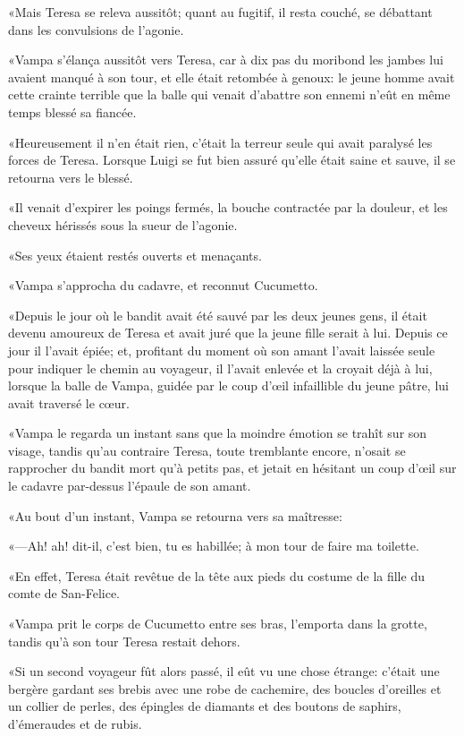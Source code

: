 «Mais Teresa se releva aussitôt; quant au fugitif, il resta couché, se débattant dans les convulsions de l'agonie. 

«Vampa s'élança aussitôt vers Teresa, car à dix pas du moribond les jambes lui avaient manqué à son tour, et elle était retombée à genoux: le jeune homme avait cette crainte terrible que la balle qui venait d'abattre son ennemi n'eût en même temps blessé sa fiancée. 

«Heureusement il n'en était rien, c'était la terreur seule qui avait paralysé les forces de Teresa. Lorsque Luigi se fut bien assuré qu'elle était saine et sauve, il se retourna vers le blessé. 

«Il venait d'expirer les poings fermés, la bouche contractée par la douleur, et les cheveux hérissés sous la sueur de l'agonie. 

«Ses yeux étaient restés ouverts et menaçants. 

«Vampa s'approcha du cadavre, et reconnut Cucumetto.  

«Depuis le jour où le bandit avait été sauvé par les deux jeunes gens, il était devenu amoureux de Teresa et avait juré que la jeune fille serait à lui. Depuis ce jour il l'avait épiée; et, profitant du moment où son amant l'avait laissée seule pour indiquer le chemin au voyageur, il l'avait enlevée et la croyait déjà à lui, lorsque la balle de Vampa, guidée par le coup d'œil infaillible du jeune pâtre, lui avait traversé le cœur. 

«Vampa le regarda un instant sans que la moindre émotion se trahît sur son visage, tandis qu'au contraire Teresa, toute tremblante encore, n'osait se rapprocher du bandit mort qu'à petits pas, et jetait en hésitant un coup d'œil sur le cadavre par-dessus l'épaule de son amant. 

«Au bout d'un instant, Vampa se retourna vers sa maîtresse: 

«—Ah! ah! dit-il, c'est bien, tu es habillée; à mon tour de faire ma toilette. 

«En effet, Teresa était revêtue de la tête aux pieds du costume de la fille du comte de San-Felice. 

«Vampa prit le corps de Cucumetto entre ses bras, l'emporta dans la grotte, tandis qu'à son tour Teresa restait dehors. 

«Si un second voyageur fût alors passé, il eût vu une chose étrange: c'était une bergère gardant ses brebis avec une robe de cachemire, des boucles d'oreilles et un collier de perles, des épingles de diamants et des boutons de saphirs, d'émeraudes et de rubis. 

